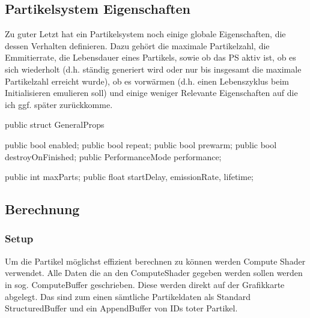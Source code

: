 \subsection{Partikelsystem Eigenschaften}

Zu guter Letzt hat ein Partikelsystem noch einige globale Eigenschaften, die dessen Verhalten definieren. Dazu gehört die maximale Partikelzahl, die Emmitierrate, die Lebensdauer eines Partikels, sowie ob das PS aktiv ist, ob es sich wiederholt (d.h. ständig generiert wird oder nur bis insgesamt die maximale Partikelzahl erreicht wurde), ob es vorwärmen (d.h. einen Lebenszyklus beim Initialisieren emulieren soll) und einige weniger Relevante Eigenschaften auf die ich ggf. später zurückkomme.

\begin{csh}
public struct GeneralProps
{
    public bool enabled;
    public bool repeat;
    public bool prewarm;
    public bool destroyOnFinished;
    public PerformanceMode performance;

    public int maxParts;
    public float startDelay, emissionRate, lifetime;
}
\end{csh}



\subsection{Berechnung}


\subsubsection{Setup}

Um die Partikel möglichst effizient berechnen zu können werden Compute Shader verwendet. Alle Daten die an den ComputeShader gegeben werden sollen werden in sog. ComputeBuffer geschrieben. Diese werden direkt auf der Grafikkarte abgelegt. Das sind zum einen sämtliche Partikeldaten als Standard StructuredBuffer und ein AppendBuffer von IDs toter Partikel.

